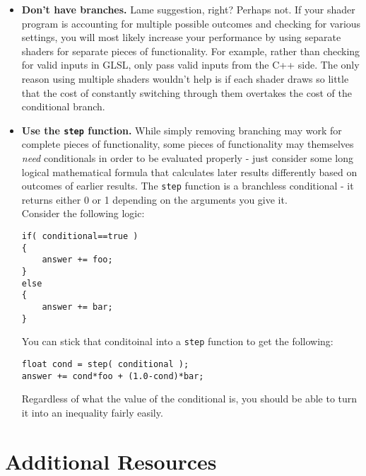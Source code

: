 \documentclass{scrartcl}
\begin{document}
\begin{itemize}

\item \textbf{Don't have branches.} Lame suggestion, right? Perhaps not. If your shader program is accounting for multiple possible outcomes and checking for various settings, you will most likely increase your performance by using separate shaders for separate pieces of functionality. For example, rather than checking for valid inputs in GLSL, only pass valid inputs from the C++ side. The only reason using multiple shaders wouldn't help is if each shader draws so little that the cost of constantly switching through them overtakes the cost of the conditional branch.

\item \textbf{Use the \texttt{step} function.} While simply removing branching may work for complete pieces of functionality, some pieces of functionality may themselves \textit{need} conditionals in order to be evaluated properly - just consider some long logical mathematical formula that calculates later results differently based on outcomes of earlier results. The \texttt{step} function is a branchless conditional - it returns either 0 or 1 depending on the arguments you give it. \\

Consider the following logic:\\

\begin{lstlisting}
if( conditional==true )
{
	answer += foo;
}
else
{
	answer += bar;
}
\end{lstlisting}

You can stick that conditoinal into a \texttt{step} function to get the following:\\

\begin{lstlisting}
float cond = step( conditional );
answer += cond*foo + (1.0-cond)*bar;
\end{lstlisting}

Regardless of what the value of the conditional is, you should be able to turn it into an inequality fairly easily.

\end{itemize}


\newpage

\section{ Additional Resources }
\end{document}
